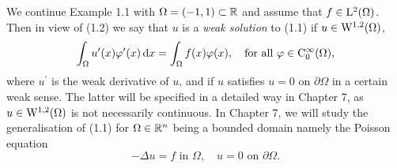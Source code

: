\begin{ex}
  We continue Example 1.1 with $\Omega = (-1,1) \subset \mathbb{R}$ and assume that $f \in \mathrm{L}^2(\Omega)$.
  Then in view of (1.2) we say that $u$ is a \emph{weak solution} to (1.1) if $u \in \mathrm{W}^{1,2}(\Omega)$,
  $$
  \int_\Omega u^\prime(x) \varphi^\prime(x) \, {\operatorname{d}\!{x}} = \int_\Omega f(x) \varphi(x), \quad \text{for all } \varphi \in \mathrm{C}_0^\infty(\Omega),
  $$
  where $u^\prime$ is the weak derivative of $u$, and if $u$ satisfies $u = 0$ on $\partial \Omega$ in a certain weak sense.
  The latter will be specified in a detailed way in Chapter 7, as $u \in \mathrm{W}^{1,2}(\Omega)$ is not necessarily continuous.
  In Chapter 7, we will study the generalisation of (1.1) for $\Omega \in \mathbb{R}^n$ being a bounded domain namely the Poisson equation
  $$
  -\Delta u = f \text{ in } \Omega, \quad u = 0 \text{ on } \partial \Omega.
  $$
\end{ex}
